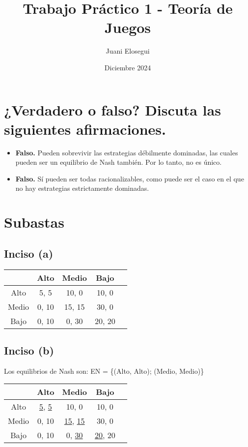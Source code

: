 \documentclass{article}
\title{Trabajo Práctico 1 - Teoría de Juegos}
\author{Juani Elosegui}
\date{Diciembre 2024}
\newcommand{\ulcolor}[2][Red]{\setulcolor{#1}\ul{#2}}
\begin{document}
    \maketitle
    
    \section{¿Verdadero o falso? Discuta las siguientes afirmaciones.}
        \begin{itemize}
            \item \textbf{Falso.} Pueden sobrevivir las estrategias débilmente dominadas, las cuales pueden ser un equilibrio de Nash también. Por lo tanto, no es único.
            \item \textbf{Falso.} Sí pueden ser todas racionalizables, como puede ser el caso en el que no hay estrategias estrictamente dominadas. 
        \end{itemize}
    \section{Subastas}
        \subsection*{Inciso (a)}
            \begin{table}[H]
                \begin{tabular}{|c|c|c|c|c|}
                            \hline
                                    & Alto & Medio & Bajo \\ \hline
                            Alto    & 5, 5 & 10, 0 & 10, 0 \\ 
                            Medio   & 0, 10 & 15, 15 & 30, 0 \\
                            Bajo    & 0, 10 & 0, 30 & 20, 20 \\ \hline
                \end{tabular}
            \end{table}
        \subsection*{Inciso (b)}
            Los equilibrios de Nash son: EN = \{(Alto, Alto); (Medio, Medio)\}
            \begin{table}[H]
                \begin{tabular}{|c|c|c|c|c|}
                            \hline
                                    & Alto & Medio & Bajo  \\ \hline
                            Alto    & \ulcolor[Red]{5}, \ulcolor[Blue]{5} & 10, 0 & 10, 0 \\ 
                            Medio   & 0, 10 & \ulcolor[Red]{15}, \ulcolor[Blue]{15} & 30, 0 \\
                            Bajo    & 0, 10 & 0, \ulcolor[Blue]{30} & \ulcolor[Red]{20}, 20 \\ \hline
                \end{tabular}
            \end{table}
\end{document}
